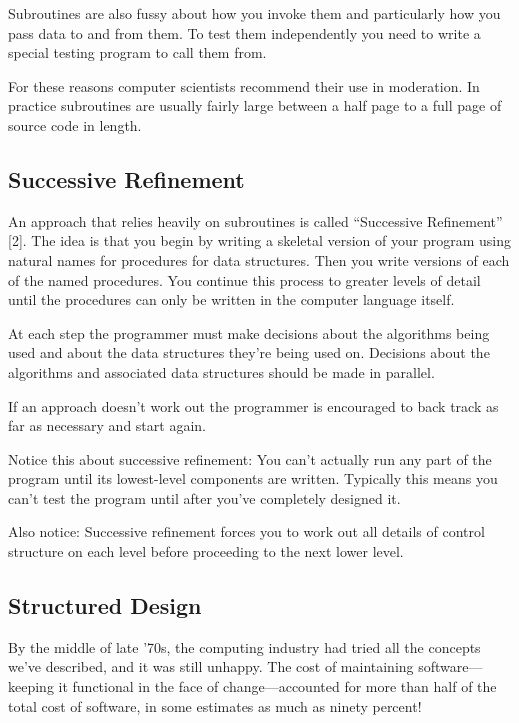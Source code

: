 Subroutines are also fussy about how you invoke them and particularly
how you pass data to and from them. To test them independently you
need to write a special testing program to call them from.

For these reasons computer scientists recommend their use in moderation.
In practice subroutines are usually fairly large between a half page
to a full page of source code in length.


\subsection{Successive Refinement}
An approach that relies heavily on subroutines is called {}``Successive
Refinement'' {[}2{]}. The idea is that you begin by writing a skeletal
version of your program using natural names for procedures for data
structures. Then you write versions of each of the named procedures.
You continue this process to greater levels of detail until the procedures
can only be written in the computer language itself.

At each step the programmer must make decisions about the algorithms
being used and about the data structures they're being used on. Decisions
about the algorithms and associated data structures should be made
in parallel.

If an approach doesn't work out the programmer is encouraged to back
track as far as necessary and start again.

Notice this about successive refinement: You can't actually run any
part of the program until its lowest-level components are written.
Typically this means you can't test the program until after you've
completely designed it. 

Also notice: Successive refinement forces you to work out all details
of control structure on each level before proceeding to the next lower
level.


\subsection{Structured Design}

By the middle of late '70s, the computing industry had tried all the
concepts we've described, and it was still unhappy. The cost of maintaining
software---keeping it functional in the face of change---accounted
for more than half of the total cost of software, in some estimates
as much as ninety percent!


